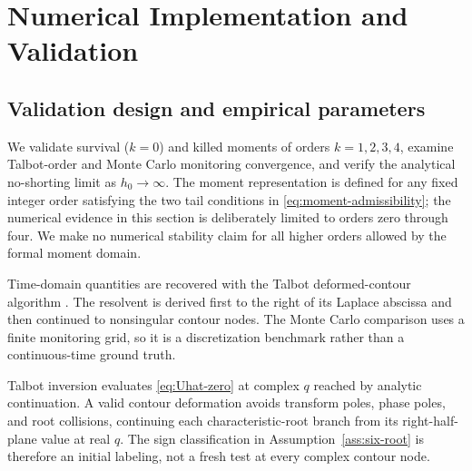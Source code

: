 \section{Numerical Implementation and Validation}\label{sec:numerical}

\subsection{Validation design and empirical parameters}

We validate survival ($k=0$) and killed moments of orders $k=1,2,3,4$, examine
Talbot-order and Monte Carlo monitoring convergence, and verify the analytical no-shorting
limit as $h_0\to\infty$. The moment representation is defined for any fixed integer order
satisfying the two tail conditions in \eqref{eq:moment-admissibility}; the numerical evidence in
this section is deliberately limited to orders zero through four. We make no numerical
stability claim for all higher orders allowed by the formal moment domain.

Time-domain quantities are recovered with the Talbot deformed-contour algorithm
\citep{Talbot1979}. The resolvent is derived first to the right of its Laplace abscissa and
then continued to nonsingular contour nodes. The Monte Carlo comparison uses a finite
monitoring grid, so it is a discretization benchmark rather than a continuous-time ground
truth.

\begin{remark}\label{rem:talbot-continuation}
Talbot inversion evaluates \eqref{eq:Uhat-zero} at complex $q$ reached by analytic
continuation. A valid contour deformation avoids transform poles, phase poles, and root
collisions, continuing each characteristic-root branch from its right-half-plane value at
real $q$. The sign classification in Assumption~\ref{ass:six-root} is therefore an initial
labeling, not a fresh test at every complex contour node.
\end{remark}

